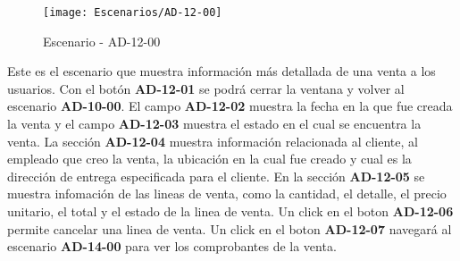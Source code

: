 \begin{figure}[H]
\centering
\texttt{[image: Escenarios/AD-12-00]}
\caption{Escenario - AD-12-00}
\label{fig:AD-12-00}
\end{figure}
Este es el escenario que muestra información más detallada de una venta a los usuarios.
Con el botón \textbf{AD-12-01} se podrá cerrar la ventana y volver al escenario \textbf{AD-10-00}. El campo \textbf{AD-12-02} muestra la fecha en la que fue creada la venta y el campo \textbf{AD-12-03} muestra el estado en el cual se encuentra la venta.
La sección \textbf{AD-12-04} muestra información relacionada al cliente, al empleado que creo la venta, la ubicación en la cual fue creado y cual es la dirección de entrega especificada para el cliente.
En la sección \textbf{AD-12-05} se muestra infomación de las lineas de venta, como la cantidad, el detalle, el precio unitario, el total y el estado de la linea de venta. Un click en el boton \textbf{AD-12-06} permite cancelar una linea de venta. Un click en el boton \textbf{AD-12-07} navegará al escenario \textbf{AD-14-00} para ver los comprobantes de la venta. 
\\